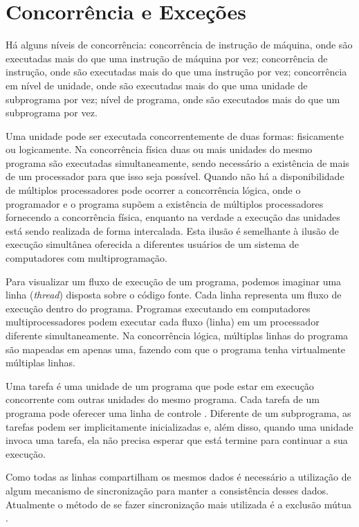 \chapter{Concorrência e Exceções}

Há alguns níveis de concorrência: concorrência de instrução de máquina, onde são
executadas mais do que uma instrução de máquina por vez; concorrência de
instrução, onde são executadas mais do que uma instrução por vez;
concorrência em nível de unidade, onde são executadas mais do que uma
unidade de subprograma por vez; nível de programa, onde são executados mais
do que um subprograma por vez. 

Uma unidade pode ser executada concorrentemente de duas formas: fisicamente
ou logicamente. Na concorrência física duas ou mais unidades do mesmo
programa são executadas simultaneamente, sendo necessário a existência de
mais de um processador para que isso seja possível. Quando não há a
disponibilidade de múltiplos processadores pode ocorrer a concorrência
lógica, onde o programador e o programa supõem a existência de múltiplos
processadores fornecendo a concorrência física, enquanto na verdade a
execução das unidades está sendo realizada de forma intercalada. Esta
ilusão é semelhante à ilusão de execução simultânea oferecida a diferentes
usuários de um sistema de computadores com multiprogramação.

Para visualizar um fluxo de execução de um programa, podemos imaginar uma
linha ({\it thread}) disposta sobre o código fonte. Cada linha representa um
fluxo de execução dentro do programa. Programas executando em computadores
multiprocessadores podem executar cada fluxo (linha) em um processador
diferente simultaneamente. Na concorrência lógica,  múltiplas linhas do
programa são mapeadas em apenas uma, fazendo com que o programa tenha
virtualmente múltiplas linhas. 

Uma tarefa é uma unidade de um programa que pode estar em execução
concorrente com outras unidades do mesmo programa. Cada tarefa de um
programa pode oferecer uma linha de controle \cite{sebesta}. Diferente de
um subprograma, as tarefas podem ser implicitamente inicializadas e, além
disso, quando uma unidade invoca uma tarefa, ela não precisa esperar que
está termine para continuar a sua execução.

Como todas as linhas compartilham os mesmos dados é necessário a utilização
de algum mecanismo de sincronização para manter a consistência desses
dados. Atualmente o método de se fazer sincronização mais utilizada é
a exclusão mútua \cite{ARTOFMPP, MCRT}. 

